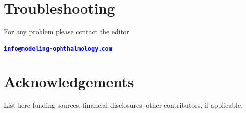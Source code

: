 \documentclass{jmoarticle}
\begin{document}
\section{Troubleshooting}

For any problem please contact the editor

\noindent
\begin{center}
\textbf{\textcolor{blue}{
\texttt{info@modeling-ophthalmology.com}
}}
\end{center}

\section*{Acknowledgements}
List here funding sources, financial disclosures, other contributors, if applicable.

\end{document}
